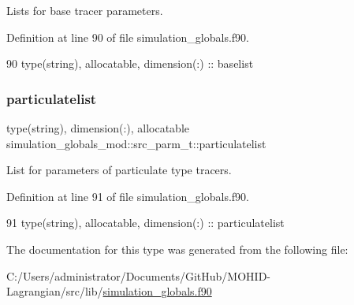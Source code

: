 Lists for base tracer parameters. 



Definition at line 90 of file simulation\+\_\+globals.\+f90.


\begin{DoxyCode}
90         \textcolor{keywordtype}{type}(string), \textcolor{keywordtype}{allocatable}, \textcolor{keywordtype}{dimension(:)} :: baselist
\end{DoxyCode}
\mbox{\label{structsimulation__globals__mod_1_1src__parm__t_ab259c4c5cd79464ea8159a87334c982f}} 
\subsubsection{\texorpdfstring{particulatelist}{particulatelist}}
{\footnotesize\ttfamily type(string), dimension(\+:), allocatable simulation\+\_\+globals\+\_\+mod\+::src\+\_\+parm\+\_\+t\+::particulatelist\hspace{0.3cm}{\ttfamily [private]}}



List for parameters of particulate type tracers. 



Definition at line 91 of file simulation\+\_\+globals.\+f90.


\begin{DoxyCode}
91         \textcolor{keywordtype}{type}(string), \textcolor{keywordtype}{allocatable}, \textcolor{keywordtype}{dimension(:)} :: particulatelist
\end{DoxyCode}


The documentation for this type was generated from the following file\+:\begin{DoxyCompactItemize}
\item 
C\+:/\+Users/administrator/\+Documents/\+Git\+Hub/\+M\+O\+H\+I\+D-\/\+Lagrangian/src/lib/\mbox{\hyperlink{simulation__globals_8f90}{simulation\+\_\+globals.\+f90}}\end{DoxyCompactItemize}
